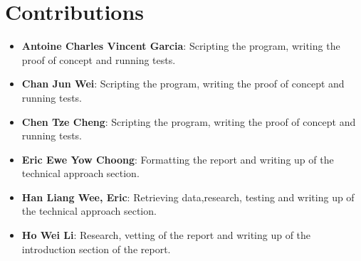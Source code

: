 \documentclass{article}
\begin{document}
	\section{Contributions}
	\begin{itemize}
		\item \textbf{Antoine Charles Vincent Garcia}: 
		Scripting the program, writing the proof of concept and running tests.
		\item \textbf{Chan Jun Wei}: 
		Scripting the program, writing the proof of concept and running tests.
		\item \textbf{Chen Tze Cheng}: 
		Scripting the program, writing the proof of concept and running tests.
		\item \textbf{Eric Ewe Yow Choong}: 
		Formatting the report and writing up of the technical approach section.
		\item \textbf{Han Liang Wee, Eric}: 
		Retrieving data,research, testing and writing up of the technical approach section.
		\item \textbf{Ho Wei Li}: 
		Research, vetting of the report and writing up of the introduction section of the report. \\
	\end{itemize}
	
	
	{\scriptsize }
\end{document}

